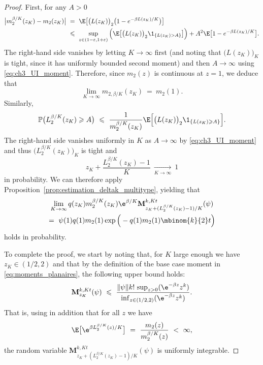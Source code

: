 \begin{refsegment}
\begin{proof}
    First, for any $A > 0$
    \begin{align*}
        \big|m^{\beta/K}_2(z_K) - m_2(z_K)\big| 
      \  & =\
        \E\big[ \big(L(z_K)\big)_2 \big( 1 - e^{-\beta L(z_K) / K}\big) \big] \\
        & \leqslant\
        \sup_{z \in (1-\varepsilon, 1+\varepsilon)} 
        \Big( \E\big[ \big(L(z_K)\big)_2 \1_{\{L(z_K) > A\}} \big] \Big)
        +
        A^2 \E\big[ 1- e^{-\beta L(z_K) / K} \big].
    \end{align*}
    The right-hand side vanishes by letting $K \to \infty$ first (and
    noting that $\big(L(z_K)\big)_K$ is tight, since it has uniformly bounded
    second moment) and then $A \to \infty$ using \eqref{eq:ch3_UI_moment}.
    Therefore, since $m_2(z)$ is continuous at $z=1$, we deduce
    that 
    \[
        \lim_{K \to \infty} m_{2, \beta/K}(z_K)\ =\ m_2(1).
    \]
    Similarly,
    \[
        \mathbb{P}\big(L_{2}^{\beta/K}(z_K) \geqslant A\big) \ \leqslant\
        \frac{1}{m^{\beta/K}_2(z_K)} \E\Big[ \big(L(z_K)\big)_2 \1_{\{ L(z_K) \geqslant
        A\}} \Big].
    \]
    The right-hand side vanishes uniformly in $K$ as $A \to \infty$ by
    \eqref{eq:ch3_UI_moment} and thus $\big(L^{\beta/K}_2(z_K)\big)_K$ is tight and 
    \[
        z_K + \frac{L^{\beta/K}_2(z_K)-1}{K}
      \  \underset{K\to\infty}{\longrightarrow}\ 1
    \]
    in probability. We can therefore apply
    Proposition~\ref{prop:estimation_deltak_multitype}, yielding that 
    \begin{multline*}
        \lim_{K\to\infty} q(z_K) m^{\beta/K}_2(z_K) \e^{\beta/K}
        \mathbf{M}^{k,Kt}_{z_K+(L^{\beta/K}_2(z_K)-1)/K}(\psi) 
        \\ =\ \psi(1)q(1)m_2(1)\exp\Big(-q(1)m_2(1)\mbinom{k}{2}t\Big)
    \end{multline*}
    holds in probability. 
    
    To complete the proof, we start by noting that, for $K$ large
    enough we have $z_K \in (1/2, 2)$ and that by the definition of the base case moment in \eqref{eq:moments_planaires}, the following upper bound holds:
    \[
     \mathbf{M}^{k,Kt}_{z_K}(\psi)\ \leqslant\ \frac{\lVert\psi\rVert
        k!\, \sup_{z > 0} (\e^{-\beta z} z^k)}
        {\inf_{z \in (1/2,2)} (\e^{-\beta z} z^k)}.
    \]
    That is, using in addition that for all $z$ we have 
    \[
    \E\big[\e^{\beta L_2^{\beta/K}(z)/K}\big]\ =\ \frac{m_2(z)}{ m^{\beta/K}_2(z)}\ <\ \infty,\] 
    the random variable $\mathbf{M}^{k,Kt}_{z_K+(L^{\beta/K}_2(z_K)-1)/K}(\psi)$ is uniformly integrable.
\end{proof}


\end{refsegment}
